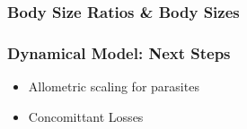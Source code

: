 \documentclass{beamer}
\begin{document}
\begin{frame}
\frametitle{Body Size Ratios \& Body Sizes}
\end{frame}


\begin{frame}
\frametitle{Dynamical Model: Next Steps}
\begin{itemize}[<+->]
\item Allometric scaling for parasites
\item Concomittant Losses
\end{itemize}
\end{frame}


\end{document}

